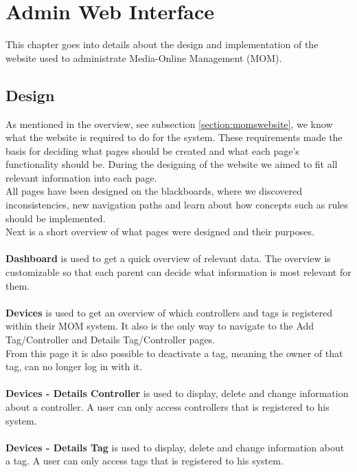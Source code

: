\chapter{Admin Web Interface}
\label{chap:website}
This chapter goes into details about the design and implementation of the website used to administrate Media-Online Management (MOM).

\section{Design}
As mentioned in the overview, see subsection \vref{section:momswebsite}, we know what the website is required to do for the system.
These requirements made the basis for deciding what pages should be created and what each page's functionality should be. During the designing of the website we aimed to fit all relevant information into each page.\\
All pages have been designed on the blackboards, where we discovered inconsistencies, new navigation paths and learn about how concepts such as rules should be implemented.\\
Next is a short overview of what pages were designed and their purposes.\\
\\
\textbf{Dashboard} is used to get a quick overview of relevant data. The overview is customizable so that each parent can decide what information is most relevant for them.\\
\\
\textbf{Devices} is used to get an overview of which controllers and tags is registered within their MOM system. It also is the only way to navigate to the Add Tag/Controller and Details Tag/Controller pages.\\
From this page it is also possible to deactivate a tag, meaning the owner of that tag, can no longer log in with it.\\
\\
\textbf{Devices - Details Controller} is used to display, delete and change information about a controller. A user can only access controllers that is registered to his system.\\
\\
\textbf{Devices - Details Tag} is used to display, delete and change information about a tag. A user can only access tags that is registered to his system.\\
